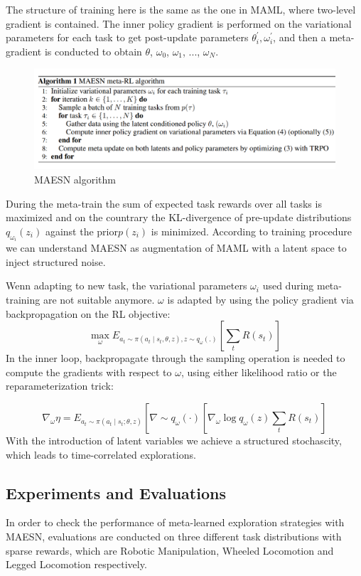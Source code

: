 The structure of training here is the same as the one in MAML, where two-level gradient is contained. The inner policy gradient is performed on the variational parameters for each task to get post-update parameters $\theta_{i}^{\prime}, \omega_{i}^{\prime}$, and then a meta-gradient is conducted to obtain $\theta$, $\omega_{0}$, $\omega_{1}$, ..., $\omega_{N}$.

\begin{figure}[H]
	\includegraphics[scale=0.34]{MAESN_04.PNG}
	\centering
	\caption{MAESN algorithm}
	\label{MAESN}
\end{figure}

During the meta-train the sum of expected task rewards over all tasks is maximized and on the countrary the KL-divergence of pre-update distributions $q_{\omega_{i}}\left(z_{i}\right)$
against the prior$p\left(z_{i}\right)$ is minimized.
According to training procedure we can understand MAESN as augmentation of MAML with a latent space to inject structured noise.

Wenn adapting to new task, the variational parameters $\omega_{i}$ used during meta-training are not suitable anymore. $\omega$ is adapted by using the policy gradient via backpropagation on the RL objective:
$$
\max _{\omega} E_{a_{t} \sim \pi\left(a_{t} \mid s_{t}, \theta, z\right), z \sim q_{\omega}(.)}\left[\sum_{t} R\left(s_{t}\right)\right]
$$
In the inner loop, backpropagate through the sampling operation is needed to compute the gradients with respect to $\omega$, using either likelihood ratio or the reparameterization trick:

$$
\nabla_{\omega} \eta=E_{a_{t} \sim \pi\left(a_{t} \mid s_{t} ; \theta, z\right)}\left[\nabla \sim q_{\omega}(\cdot)^{ }\left[\nabla_{\omega} \log q_{\omega}(z) \sum_{t} R\left(s_{t}\right)\right]\right.
$$
With the introduction of latent variables we achieve a structured stochascity, which leads to time-correlated explorations. 

\subsection{Experiments and Evaluations}
In order to check the performance of meta-learned exploration strategies with MAESN, evaluations are conducted on three different task distributions with sparse rewards, which are Robotic Manipulation, Wheeled Locomotion and Legged Locomotion respectively. 

